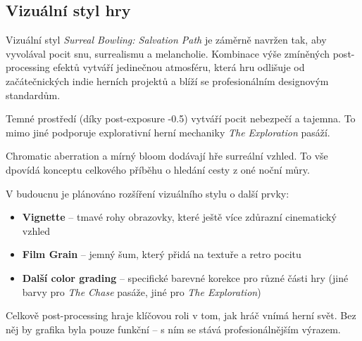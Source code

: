\subsection{Vizuální styl hry}
\label{sec:vizualni-styl-hry}

Vizuální styl \emph{Surreal Bowling: Salvation Path} je záměrně navržen tak, aby vyvolával pocit snu, surrealismu a melancholie. Kombinace výše zmíněných post-processing efektů vytváří jedinečnou atmosféru, která hru odlišuje od začátečnických indie herních projektů a blíží se profesionálním designovým standardům.

Temné prostředí (díky post-exposure -0.5) vytváří pocit nebezpečí a tajemna. To mimo jiné podporuje explorativní herní mechaniky \emph{The Exploration} pasáží.

Chromatic aberration a mírný bloom dodávají hře surreální vzhled. To vše dpovídá konceptu celkového příběhu o hledání cesty z oné noční můry.

V budoucnu je plánováno rozšíření vizuálního stylu o další prvky:
\begin{itemize}
    \item \textbf{Vignette} -- tmavé rohy obrazovky, které ještě více zdůrazní cinematický vzhled
    \item \textbf{Film Grain} -- jemný šum, který přidá na textuře a retro pocitu
    \item \textbf{Další color grading} -- specifické barevné korekce pro různé části hry (jiné barvy pro \emph{The Chase} pasáže, jiné pro \emph{The Exploration})
\end{itemize}

Celkově post-processing hraje klíčovou roli v tom, jak hráč vnímá herní svět. Bez něj by grafika byla pouze funkční -- s ním se stává profesionálnějším výrazem.